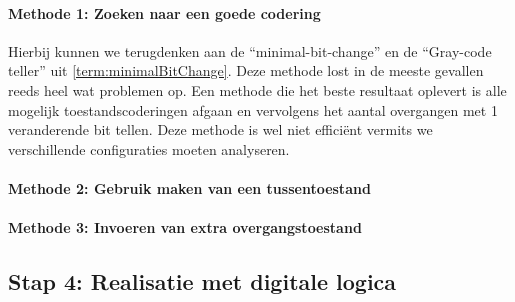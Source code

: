 \paragraph{Methode 1: Zoeken naar een goede codering}Hierbij kunnen we terugdenken aan de ``minimal-bit-change'' en de ``Gray-code teller'' uit \ref{term:minimalBitChange}. Deze methode lost in de meeste gevallen reeds heel wat problemen op. Een methode die het beste resultaat oplevert is alle mogelijk toestandscoderingen afgaan en vervolgens het aantal overgangen met 1 veranderende bit tellen. Deze methode is wel niet effici\"ent vermits we  verschillende configuraties moeten analyseren.
\paragraph{Methode 2: Gebruik maken van een tussentoestand}
\paragraph{Methode 3: Invoeren van extra overgangstoestand}
\subsection{Stap 4: Realisatie met digitale logica}